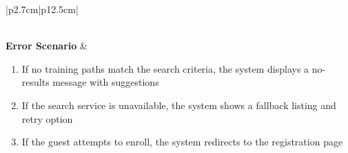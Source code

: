 \begin{table}[H]
\begin{tabular}{|p{2.7cm}|p{12.5cm}|}
\begin{minipage}[t]{\linewidth}
                                  \end{minipage}                        \\
        \hline
        \textbf{Error Scenario} & \begin{minipage}[t]{\linewidth}
                                      \begin{enumerate}[topsep=0pt,itemsep=1pt,parsep=0pt,partopsep=0pt]
                                          \item If no training paths match the search criteria, the system displays a
                                                no-results message with suggestions
                                          \item If the search service is unavailable, the system shows a fallback listing and
                                                retry option
                                          \item If the guest attempts to enroll, the system redirects to the registration page
                                      \end{enumerate}
                                  \end{minipage}                        \\
        \hline
    \end{tabular}
    \label{tab:guest-search-training-paths}

\end{table}
